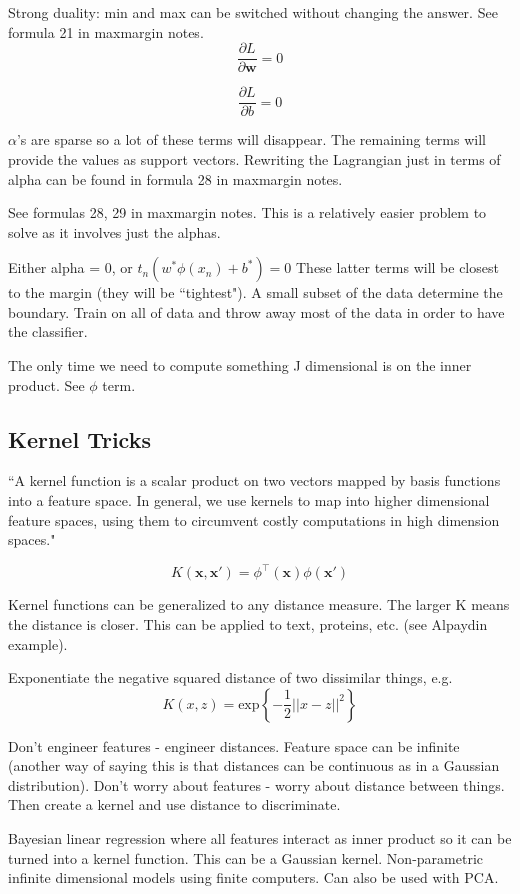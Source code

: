 \documentclass[11pt, oneside]{article}   	%
\begin{document}
Strong duality: min and max can be switched without changing the answer. See formula 21 in maxmargin notes.
\[
\frac{\partial L}{\partial \mathbf{w}} = 0 
\]

\[
\frac{\partial L}{\partial b} = 0 
\]

$\alpha$'s are sparse so a lot of these terms will disappear. The remaining terms will provide the values as support vectors. Rewriting the Lagrangian just in terms of alpha can be found in formula 28 in maxmargin notes.

See formulas 28, 29 in maxmargin notes. This is a relatively easier problem to solve as it involves just the alphas.

Either alpha = 0, or $t_n(w^*\phi(x_n)+b^*) = 0$ These latter terms will be closest to the margin (they will be ``tightest"). A small subset of the data determine the boundary. Train on all of data and throw away most of the data in order to have the classifier.

The only time we need to compute something J dimensional is on the inner product. See $\phi$ term.

\subsection {Kernel Tricks}


``A kernel function is a scalar product on two vectors mapped by basis functions into a feature space. In general, we use kernels to map into higher dimensional feature spaces, using them to circumvent costly computations in high dimension spaces."

\[
K(\mathbf{x},\mathbf{x}') = \phi^\intercal(\mathbf{x})\phi(\mathbf{x}')
\]

Kernel functions can be generalized to any distance measure. The larger K means the distance is closer. This can be applied to text, proteins, etc. (see Alpaydin example).

Exponentiate the negative squared distance of two dissimilar things, e.g.
\[
K(x,z) = \text{exp}\left\{ -\frac{1}{2} ||x - z||^2 \right\}
\]

Don't engineer features - engineer distances. Feature space can be infinite (another way of saying this is that distances can be continuous as in a Gaussian distribution). Don't worry about features - worry about distance between things. Then create a kernel and use distance to discriminate.

Bayesian linear regression where all features interact as inner product so it can be turned into a kernel function. This can be a Gaussian kernel. Non-parametric infinite dimensional models using finite computers. Can also be used with PCA.
\end{document}
